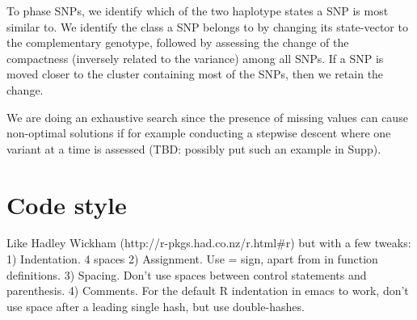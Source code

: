 To phase SNPs, we identify which of the two haplotype states a SNP is most similar to. We identify the class a SNP belongs to by changing its state-vector to the complementary genotype, followed by assessing the change of the compactness (inversely related to the variance) among all SNPs. If a SNP is moved closer to the cluster containing most of the SNPs, then we retain the change. 

We are doing an exhaustive search since the presence of missing values
can cause non-optimal solutions if for example conducting a stepwise
descent where one variant at a time is assessed (TBD: possibly put
such an example in Supp).

\section{Code style}
Like Hadley Wickham (http://r-pkgs.had.co.nz/r.html#r) but with a few tweaks:
1) Indentation. 4 spaces
2) Assignment. Use = sign, apart from in function definitions.
3) Spacing. Don't use spaces between control statements and parenthesis.
4) Comments. For the default R indentation in emacs to work, don't use space
after a leading single hash, but use double-hashes.